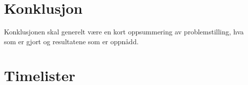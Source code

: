 \documentclass[11pt,a4]{report}
\begin{document}
\thispagestyle{empty}

\newpage

  
\tableofcontents

\newpage



\newpage






























\chapter{Konklusjon}\label{kap:konklusjon}
Konklusjonen skal generelt være en kort oppsummering av
problemstilling, hva som er gjort og resultatene som er oppnådd.





\appendix

\renewcommand{\appendixname}{Vedlegg}
\renewcommand{\appendixpagename}{Vedlegg}



\chapter{Timelister}\label{ch:vedlegg_A}
\end{document}

